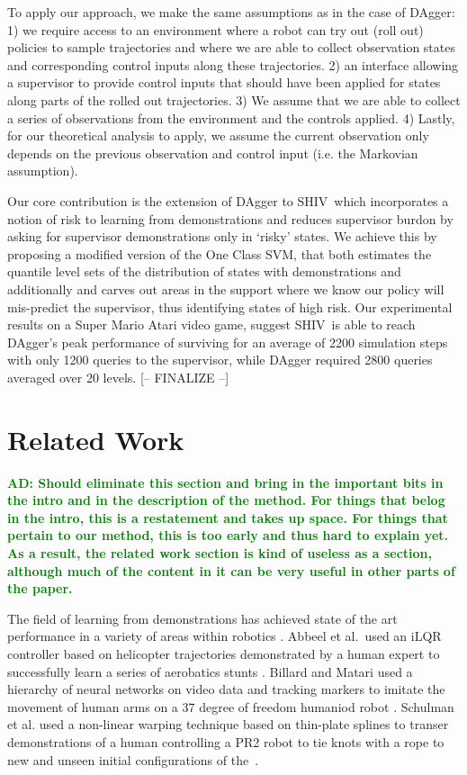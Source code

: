 \documentclass[10pt, conference]{ieeeconf}      %
\newcommand{\acro}{SHIV}
\newcommand{\adnote}[1]{\ifthenelse{\boolean{include-notes}}%
 {\textcolor{green}{\textbf{AD: #1}}}{}}
\begin{document}
To apply our approach, we make the same assumptions as in the case of DAgger: 1) we require access to an environment
where a robot can try out (roll out) policies to sample trajectories and where we are able to collect observation states
and corresponding control inputs along these trajectories. 2) an interface allowing a supervisor to provide control
inputs that should have been applied for states along parts of the rolled out trajectories. 3) We assume that we are
able to collect a series of observations from the environment and the controls applied. 4) Lastly, for our theoretical
analysis to apply, we assume the current observation only depends on the previous observation and control input (i.e.
the Markovian assumption).

Our core contribution is the extension of DAgger to \acro~which incorporates a notion of risk to learning from
demonstrations and reduces supervisor
burdon by asking for supervisor demonstrations only in `risky' states. 
We achieve this by proposing a modified version of the One Class SVM, that both estimates the quantile level sets 
of the distribution of states with demonstrations and additionally
and carves out areas in the support where we know our policy will mis-predict the supervisor, thus identifying states of high
risk.  Our experimental results on a Super Mario Atari video game,  suggest \acro~is able to reach DAgger's
peak performance of surviving for an average of 2200 simulation steps with only 1200 queries to the supervisor, while DAgger required 2800 queries
averaged over 20 levels.
{\color{blue}[-- FINALIZE --]}

\section{Related Work}
\adnote{Should eliminate this section and bring in the important bits in the intro and in the description of the method. For things that belog in the intro, this is a restatement and takes up space. For things that pertain to our method, this is too early and thus hard to explain yet. As a result, the related work section is kind of useless as a section, although much of the content in it can be very useful in other parts of the paper.}

The field of learning from demonstrations has achieved state of the art performance in a variety of areas within robotics
\cite{argall2009survey}. Abbeel et al.~used an iLQR controller based on helicopter trajectories demonstrated by a human expert
to successfully learn a series of aerobatics stunts \cite{abbeel2007application}. Billard and Matari used a hierarchy of
neural networks on video data and tracking markers to imitate the movement of human arms on a 37 degree of freedom humaniod
robot \cite{billard2001learning}. Schulman et al. used a non-linear warping technique based on thin-plate splines
to transer demonstrations of a human controlling a PR2 robot to tie knots with a rope to new and unseen initial
configurations of the~\cite{schulman2013case}. 
\end{document}
